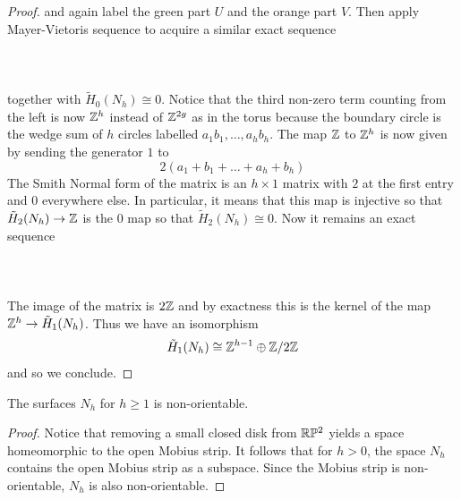 \documentclass[a4paper]{article}
\begin{document}
\begin{thm}{}{}
\begin{proof}
and again label the green part $U$ and the orange part $V$. Then apply Mayer-Vietoris sequence to acquire a similar exact sequence \\~\\
\\~\\
together with $\tilde{H}_0(N_h)\cong 0$. Notice that the third non-zero term counting from the left is now $\mathbb{Z}^h$ instead of $\mathbb{Z}^{2g}$ as in the torus because the boundary circle is the wedge sum of $h$ circles labelled $a_1b_1,\dots,a_hb_h$. The map $\mathbb{Z}$ to $\mathbb{Z}^h$ is now given by sending the generator $1$ to $$2(a_1+b_1+\dots+a_h+b_h)$$ The Smith Normal form of the matrix is an $h\times 1$ matrix with $2$ at the first entry and $0$ everywhere else. In particular, it means that this map is injective so that $\tilde{H}_2(N_h)\to\mathbb{Z}$ is the $0$ map so that $\tilde{H}_2(N_h)\cong 0$. Now it remains an exact sequence \\~\\
\\~\\
The image of the matrix is $2\mathbb{Z}$ and by exactness this is the kernel of the map $\mathbb{Z}^h\to\tilde{H}_1(N_h)$. Thus we have an isomorphism $$\tilde{H}_1(N_h)\cong\mathbb{Z}^{h-1}\oplus\mathbb{Z}/2\mathbb{Z}$$ and so we conclude. 
\end{proof}
\end{thm}

\begin{crl}{}{} The surfaces $N_h$ for $h\geq 1$ is non-orientable. \tcbline
\begin{proof}
Notice that removing a small closed disk from $\mathbb{R}\mathbb{P}^2$ yields a space homeomorphic to the open Mobius strip. It follows that for $h>0$, the space $N_h$ contains the open Mobius strip as a subspace. Since the Mobius strip is non-orientable, $N_h$ is also non-orientable. 
\end{proof}
\end{crl}
\end{document}
